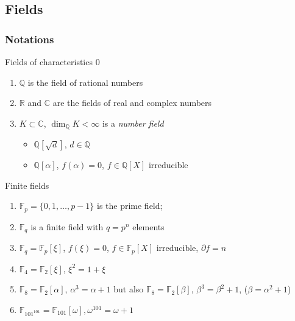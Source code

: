 \documentclass[10pt,handout]{beamer} %
\newcommand{\Q}{\mathbb Q}
\newcommand{\F}{\mathbb F}
\newcommand{\C}{\mathbb C}
\newcommand{\R}{\mathbb R}
\theoremstyle{definition}
\begin{document}
\subsection{Fields}

\begin{frame}
 \frametitle{Notations}

\begin{alertblock}{Fields of characteristics 0}
 \begin{enumerate}[<+-| alert@+>]
 \item $\Q$ is the field of rational numbers
\item $\R$ and $\C$ are the fields of real and complex numbers
\item $K\subset\C$, $\dim_\Q K<\infty$ is a \emph{number field}
\begin{itemize}
\item $\Q[\sqrt{d}]$, $d\in\Q$
\item $\Q[\alpha]$, $f(\alpha)=0$, $f\in\Q[X]$
irreducible
\end{itemize}
\end{enumerate}
\end{alertblock}

\begin{exampleblock}{Finite fields}
 \begin{enumerate}[<+-| alert@+>]
 \item $\F_p=\{0,1,\ldots,p-1\}$ is the prime field;
 \item $\F_q$ is a finite field with $q=p^n$ elements
 \item $\F_q=\F_p[\xi]$, $f(\xi)=0$, $f\in\F_p[X]$
irreducible, $\partial f=n$
\item $\F_4=\F_2[\xi]$, $\xi^2=1+\xi$
\item $\F_8=\F_2[\alpha]$, $\alpha^3=\alpha+1$ but also $\F_8=\F_2[\beta]$, $\beta^3=\beta^2+1$, ($\beta=\alpha^2+1$)
\item $\F_{101^{101}}=\F_{101}[\omega], \omega^{101}=\omega+1$
\end{enumerate}
\end{exampleblock}

\end{frame}
\end{document}
